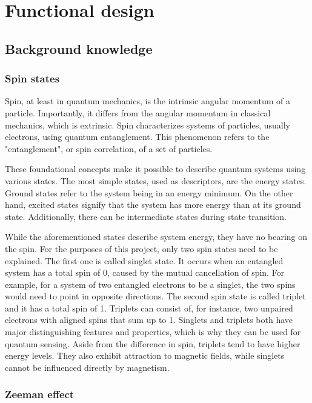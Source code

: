 \chapter{Functional design} \label{chap:func_design}
\section{Background knowledge}
\subsection{Spin states}
Spin, at least in quantum mechanics, is the intrinsic angular momentum of a particle. Importantly, it differs from the angular momentum in classical mechanics, which is extrinsic. Spin characterizes systems of particles, usually electrons, using quantum entanglement. This phenomenon refers to the "entanglement", or spin correlation, of a set of particles.

These foundational concepts make it possible to describe quantum systems using various states. The most simple states, used as descriptors, are the energy states. Ground states refer to the system being in an energy minimum. On the other hand, excited states signify that the system has more energy than at its ground state. Additionally, there can be intermediate states during state transition.

While the aforementioned states describe system energy, they have no bearing on the spin. For the purposes of this project, only two spin states need to be explained. The first one is called singlet state. It occurs when an entangled system has a total spin of 0, caused by the mutual cancellation of spin. For example, for a system of two entangled electrons to be a singlet, the two spins would need to point in opposite directions. The second spin state is called triplet and it has a total spin of 1. Triplets can consist of, for instance, two unpaired electrons with aligned spins that sum up to 1. Singlets and triplets both have major distinguishing features and properties, which is why they can be used for quantum sensing. Aside from the difference in spin, triplets tend to have higher energy levels. They also exhibit attraction to magnetic fields, while singlets cannot be influenced directly by magnetism.

\subsection{Zeeman effect}

